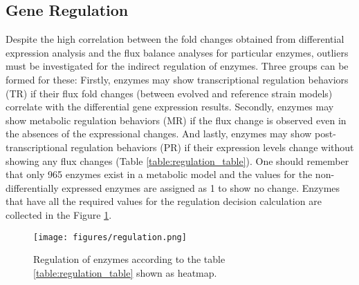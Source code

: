 \subsection{Gene Regulation}

Despite the high correlation between the fold changes obtained from differential expression analysis and the flux balance analyses for particular enzymes, outliers must be investigated for the indirect regulation of enzymes. Three groups can be formed for these: Firstly, enzymes may show transcriptional regulation behaviors (TR) if their flux fold changes (between evolved and reference strain models) correlate with the differential gene expression results. Secondly, enzymes may show metabolic regulation behaviors (MR) if the flux change is observed even in the absences of the expressional changes. And lastly, enzymes may show post-transcriptional regulation behaviors (PR) if their expression levels change without showing any flux changes (Table \ref{table:regulation_table}). One should remember that only 965 enzymes exist in a metabolic model and the values for the non-differentially expressed enzymes are assigned as 1 to show no change. Enzymes that have all the required values for the regulation decision calculation are collected in the Figure \ref{fig:fba_regulation3}.

\begin{figure}[H]
  \begin{center}
  \texttt{[image: figures/regulation.png]}
  \caption[Regulation of enzymes according to decision table shown as heatmap.]{Regulation of enzymes according to the table \ref{table:regulation_table} shown as heatmap.}
  \label{fig:fba_regulation3}
  \end{center}
\end{figure}

\vspace{-1.0cm}

